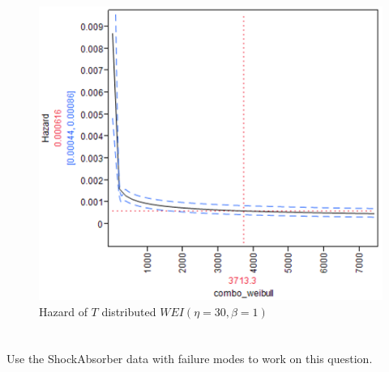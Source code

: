 \documentclass{article}
\begin{document}
\begin{enumerate}
\begin{enumerate}
   \begin{center}
        \FloatBarrier
      \begin{figure}
        \centering
        \includegraphics[width = 5in]{prob4d_weibull_combo_haz.png}
        \caption{Hazard of \(T \) distributed \( WEI(\eta = 30 , \beta = 1)\)}
      \end{figure}
      \FloatBarrier
  \end{center} 
  
  \end{enumerate}
\end{enumerate}

\section{} Use the ShockAbsorber data with failure modes to work on this question.
\end{document}
